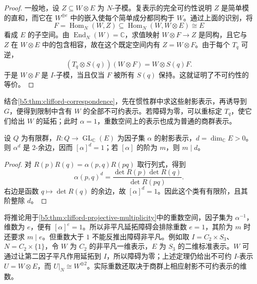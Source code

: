 \begin{proof}
	一般地，设 \(Z\subseteq W\otimes E\) 为 \(N\)-子模。复表示的完全可约性说明 \(Z\) 是简单模的直和，而它在 \(W^{\oplus e}\) 中的嵌入使每个简单成分都同构于 \(W\)。通过上面的识别，将
	\[
		F=\operatorname{Hom}_N(W,Z) \subseteq\operatorname{Hom}_N(W,W\otimes E)\cong E
	\]
	看成 \(E\) 的子空间。由 \(\operatorname{End}_N(W)=\mathbb C\)，求值映射 \(W\otimes F\to Z\) 是同构，且它与 \(Z\) 在 \(W\otimes E\) 中的包含相容，故在这个既定空间内有 \(Z=W\otimes F\)。由于每个 \(T_q\) 可逆，
	\[
		(T_q\otimes S(q))(W\otimes F)=W\otimes S(q)F.
	\]
	于是 \(W\otimes F\) 是 \(I\)-子模，当且仅当 \(F\) 被所有 \(S(q)\) 保持。这就证明了不可约性的等价。
\end{proof}

结合\cref{b5:thm:clifford-correspondence}，先在惯性群中求这些射影表示，再诱导到 \(G\)，便得到限制中含有 \(W\) 的全部不可约表示。若障碍为零，可以重标定 \(T_q\)，使它们给出 \(W\) 的延拓；此时 \(\alpha=1\)，重数空间上的表示也成为普通的商群表示。

\begin{corollary}\label{b5:cor:projective-dimension-obstruction}
	设 \(Q\) 为有限群，\(R:Q\to\operatorname{GL}_{\mathbb C}(E)\) 为因子集 \(\alpha\) 的射影表示，\(d=\dim_{\mathbb C}E>0\)。则 \(\alpha^d\) 是 \(2\)-余边，因而 \([\alpha]^d=1\)；若 \([\alpha]\) 的阶为 \(m\)，则 \(m\mid d\)。
\end{corollary}
\begin{proof}
	对 \(R(p)R(q)=\alpha(p,q)R(pq)\) 取行列式，得到
	\[
		\alpha(p,q)^d =\frac{\det R(p)\det R(q)}{\det R(pq)}.
	\]
	右边是函数 \(q\mapsto\det R(q)\) 的余边，故 \([\alpha]^d=1\)。因此这个类有有限阶，且其阶整除 \(d\)。
\end{proof}

将推论用于\cref{b5:thm:clifford-projective-multiplicity}中的重数空间，因子集为 \(\alpha^{-1}\)，维数为 \(e\)，便有 \([\alpha]^e=1\)。所以非平凡延拓障碍会排除重数 \(e=1\)，其阶为 \(m\) 时还要求 \(m\mid e\)。但重数大于 \(1\) 不能反推出障碍非平凡。例如取 \(I=C_2\times S_3\)、\(N=C_2\times\{1\}\)，令 \(W\) 为 \(C_2\) 的非平凡一维表示，\(E\) 为 \(S_3\) 的二维标准表示。\(W\) 可通过让第二因子平凡作用延拓到 \(I\)，所以障碍为零；上述定理仍给出不可约 \(I\)-表示 \(U=W\otimes E\)，而 \(U|_N\cong W^{\oplus2}\)。实际重数还取决于商群上相应射影不可约表示的维数。

